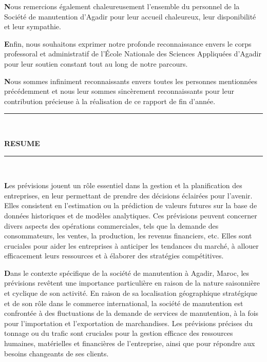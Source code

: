 \documentclass[11pt]{article}
\begin{document}
\textbf{N}ous remercions également chaleureusement l'ensemble du personnel de la Société de manutention d’Agadir pour leur accueil chaleureux, leur disponibilité et leur sympathie.\vspace{0.5cm}

\textbf{E}nfin, nous souhaitons exprimer notre profonde reconnaissance envers le corps professoral et administratif de l'École Nationale des Sciences Appliquées d'Agadir pour leur soutien constant tout au long de notre parcours.\vspace{0.5cm}

\textbf{N}ous sommes infiniment reconnaissants envers toutes les personnes mentionnées précédemment et nous leur sommes sincèrement reconnaissants pour leur contribution précieuse à la réalisation de ce rapport de fin d'année.



\newpage
\begin{center}
    {\color{cyan}\rule{\linewidth}{0.5mm}} \\[1.5ex]
    
    {\color{cyan}\Huge\bfseries RESUME\par}
    
    {\color{cyan}\rule{\linewidth}{0.5mm}} \\[2ex]
    
\end{center}

\textbf{L}es prévisions jouent un rôle essentiel dans la gestion et la planification des entreprises, en leur permettant de prendre des décisions éclairées pour l'avenir. Elles consistent en l'estimation ou la prédiction de valeurs futures sur la base de données historiques et de modèles analytiques. Ces prévisions peuvent concerner divers aspects des opérations commerciales, tels que la demande des consommateurs, les ventes, la production, les revenus financiers, etc. Elles sont cruciales pour aider les entreprises à anticiper les tendances du marché, à allouer efficacement leurs ressources et à élaborer des stratégies compétitives.\vspace{0.5cm}


\textbf{D}ans le contexte spécifique de la société de manutention à Agadir, Maroc, les prévisions revêtent une importance particulière en raison de la nature saisonnière et cyclique de son activité. En raison de sa localisation géographique stratégique et de son rôle dans le commerce international, la société de manutention est confrontée à des fluctuations de la demande de services de manutention, à la fois pour l'importation et l'exportation de marchandises. Les prévisions précises du tonnage ou du trafic sont cruciales pour la gestion efficace des ressources humaines, matérielles et financières de l'entreprise, ainsi que pour répondre aux besoins changeants de ses clients.\vspace{0.5cm}
\end{document}

